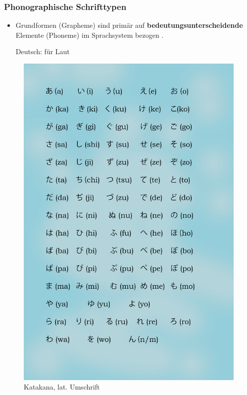 \begin{frame}
\frametitle{Phonographische Schrifttypen}

\begin{minipage}{.59\textwidth}

\begin{itemize}
	\item Grundformen (\zB Grapheme) sind primär auf \textbf{bedeutungsunterscheidende} Elemente (\zB Phoneme) im Sprachsystem bezogen \citep[vgl.][76--77]{Duerscheid04a}.
	
	\ea Deutsch:  für Laut \textipa{[k]}
	\z 
\end{itemize}

\end{minipage}\hfill%
\begin{minipage}{.4\textwidth}
\begin{figure}
	\centering
	
	\includegraphics[scale=.057]{material/05Katakana}
	\caption{Katakana, lat. Umschrift}
	\label{Katakana}
\end{figure}
\end{minipage}

\end{frame}


